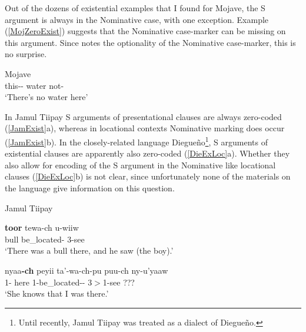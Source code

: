 \pagebreak

Out of the dozens of existential examples that I found for Mojave, the S argument is always in the Nominative case, with one exception.
Example (\ref{MojZeroExist}) suggests that the Nominative case-marker can be missing on this argument. 
Since \citet{Munro:1976} notes the optionality of the Nominative case-marker, this is no surprise. 


\begin{exe}\ex\label{MojZeroExist} {Mojave} \citep[70]{Munro:1976}\nopagebreak[4]
\gll{}  \\
this-\dem{}-\loc{} water not-\tns{}\\
\glt `There's no water here'
\end{exe} 

In Jamul Tiipay S arguments of presentational clauses are always zero-coded (\ref{JamExist}a), whereas in locational contexts Nominative marking does occur (\ref{JamExist}b). 
In the closely-related language Diegue\~no\footnote{Until recently, Jamul Tiipay was treated as a dialect of Diegue\~no.}, S arguments of existential clauses are apparently also zero-coded (\ref{DieExLoc}a). Whether they also allow for encoding of the S argument in the Nominative like locational clauses (\ref{DieExLoc}b) is not clear, since unfortunately none of the materials on the language give information on this question. 

\begin{exe}\ex\label{JamExist} {Jamul Tiipay} \citetext{Yuman; Mexico; \citealt[231]{Miller:2001}, \citealt[148]{Miller:1990}}\nopagebreak[4]
 \begin{xlist}
\ex\gll \textbf{toor} tewa-ch u-wiiw\\
bull be\_located-\ssbj{} 3-see\\
\glt `There was a bull there, and he saw (the boy).'

\ex\gll nyaa\textbf{-ch} peyii ta'-wa-ch-pu puu-ch ny-u'yaaw\\
1-\nom{} here 1-be\_located-\NR{}-\dem{} 3$>$1-see {???}\\
\glt `She knows that I was there.' 
\end{xlist}
\end{exe}

